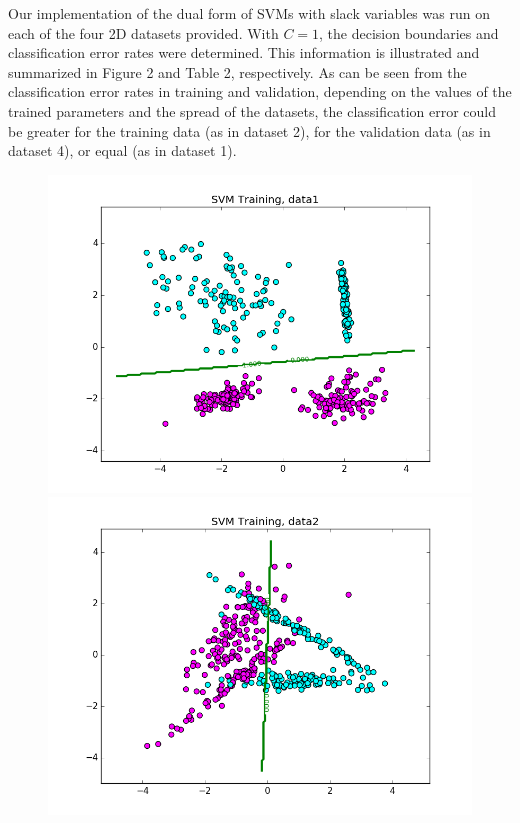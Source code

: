 \documentclass{article}
\begin{document}
Our implementation of the dual form of SVMs with slack variables was run on each of the four 2D datasets provided. With $C=1$, the decision boundaries and classification error rates were determined. This information is illustrated and summarized in Figure 2 and Table 2, respectively. As can be seen from the classification error rates in training and validation, depending on the values of the trained parameters and the spread of the datasets, the classification error could be greater for the training data (as in dataset 2), for the validation data (as in dataset 4), or equal (as in dataset 1).
\begin{figure}[width=\linewidth]
\centering
\begin{multicols}{2}
  \includegraphics[width=1.2\linewidth]{code/P2/data1,training.png}
  \includegraphics[width=1.2\linewidth]{code/P2/data2,training.png}

\end{multicols}
\end{figure}
\end{document}
